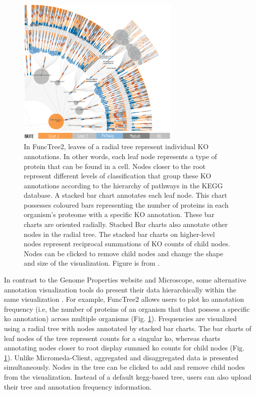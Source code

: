 \begin{figure}[!ht]
  \centering
	\includegraphics[width=0.7\textwidth]{media/functree2.png}
	 \caption{In FuncTree2, leaves of a radial tree represent individual KO annotations. In other words, each leaf node represents a type of protein that can be found in a cell. Nodes closer to the root represent different levels of classification that group these KO annotations according to the hierarchy of pathways in the KEGG database. A stacked bar chart annotates each leaf node. This chart possesses coloured bars representing the number of proteins in each organism's proteome with a specific KO annotation. These bar charts are oriented radially. Stacked Bar charts also annotate other nodes in the radial tree. The stacked bar charts on higher-level nodes represent reciprocal summations of KO counts of child nodes. Nodes can be clicked to remove child nodes and change the shape and size of the visualization. Figure is from \cite{darzi2019functree2}.}
	 \label{fig:functree2}
\end{figure}

In contrast to the Genome Properties website and Microscope, some alternative annotation visualization tools do present their data hierarchically within the same visualization \cite{darzi2019functree2}. For example, FuncTree2 \cite{darzi2019functree2} allows users to plot \gls{ko}  annotation \cite{mao2005automated,kanehisa2011kegg} frequency (i.e, the number of proteins of an organism that that possess a specific \gls{ko}  annotation) across multiple organisms (Fig. \ref{fig:functree2}). Frequencies are visualized using a radial tree with nodes annotated by stacked bar charts. The bar charts of leaf nodes of the tree represent counts for a singular \gls{ko}, whereas charts annotating nodes closer to root display summed \gls{ko}  counts for child nodes (Fig. \ref{fig:functree2}). Unlike Micromeda-Client, aggregated and disaggregated data is presented simultaneously. Nodes in the tree can be clicked to add and remove child nodes from the visualization. Instead of a default \gls{kegg}-based tree, users can also upload their tree and annotation frequency information.

